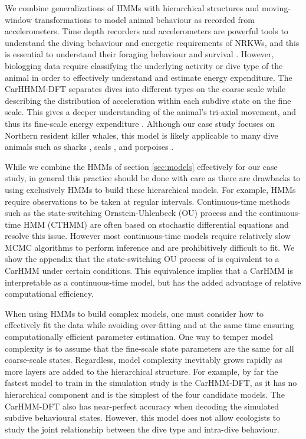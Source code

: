 We combine generalizations of HMMs with hierarchical structures and moving-window transformations to model animal behaviour as recorded from accelerometers. Time depth recorders and accelerometers are powerful tools to understand the diving behaviour and energetic requirements of NRKWs, and this is essential to understand their foraging behaviour and survival \citep{Williams:2009,Noren:2011}. However, biologging data require classifying the underlying activity \citep{Dot:2016} or dive type \citep{Hastie:2006} of the animal in order to effectively understand and estimate energy expenditure. The CarHHMM-DFT separates dives into different types on the coarse scale while describing the distribution of acceleration within each subdive state on the fine scale. This gives a deeper understanding of the animal's tri-axial movement, and thus its fine-scale energy expenditure \citep{Gleiss:2011,Qasem:2012}. Although our case study focuses on Northern resident killer whales, this model is likely applicable to many dive animals such as sharks \citep{Adam:2019}, seals \citep{Dot:2016}, and porpoises \citep{Barajas:2017}.

While we combine the HMMs of section \ref{sec:models} effectively for our case study, in general this practice should be done with care as there are drawbacks to using exclusively HMMs to build these hierarchical models. For example, HMMs require observations to be taken at regular intervals. Continuous-time methods such as the state-switching Ornstein-Uhlenbeck (OU) process \citep{Michelot:2019} and the continuous-time HMM (CTHMM) \citep{Liu:2015} are often based on stochastic differential equations and resolve this issue. However most continuous-time models require relatively slow MCMC algorithms to perform inference and are prohibitively difficult to fit. We show the appendix that the state-switching OU process of \citet{Michelot:2019} is equivalent to a CarHMM under certain conditions. This equivalence implies that a CarHMM is interpretable as a continuous-time model, but has the added advantage of relative computational efficiency.

When using HMMs to build complex models, one must consider how to effectively fit the data while avoiding over-fitting and at the same time ensuring computationally efficient parameter estimation. One way to temper model complexity is to assume that the fine-scale state parameters are the same for all coarse-scale states. Regardless, model complexity inevitably grows rapidly as more layers are added to the hierarchical structure. For example, by far the fastest model to train in the simulation study is the CarHMM-DFT, as it has no hierarchical component and is the simplest of the four candidate models. The CarHMM-DFT also has near-perfect accuracy when decoding the simulated subdive behavioural states. However, this model does not allow  ecologists  to study the joint relationship between the dive type and intra-dive behaviour. 

